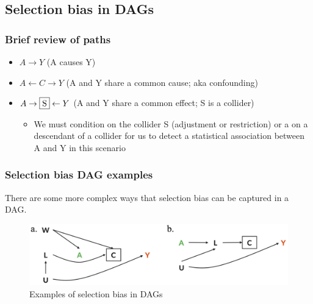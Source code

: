 \documentclass[
]{book}
\providecommand{\tightlist}{%
  \setlength{\itemsep}{0pt}\setlength{\parskip}{0pt}}
\begin{document}
\hypertarget{selection-bias-in-dags}{%
\subsection{Selection bias in DAGs}\label{selection-bias-in-dags}}

\hypertarget{brief-review-of-paths}{%
\subsubsection{Brief review of paths}\label{brief-review-of-paths}}

\begin{itemize}
\tightlist
\item
  \(A \rightarrow Y\) (A causes Y)
\item
  \(A \leftarrow C \rightarrow Y\) (A and Y share a common cause; aka confounding)
\item
  \(A \rightarrow \fbox{S} \leftarrow Y\) (A and Y share a common effect; S is a collider)

  \begin{itemize}
  \tightlist
  \item
    We must condition on the collider S (adjustment or restriction) or a on a descendant of a collider for us to detect a statistical association between A and Y in this scenario
  \end{itemize}
\end{itemize}

\hypertarget{selection-bias-dag-examples}{%
\subsubsection{Selection bias DAG examples}\label{selection-bias-dag-examples}}

There are some more complex ways that selection bias can be captured in a DAG.

\begin{figure}

{\centering \includegraphics[width=1\linewidth]{img/selection-bias/selection_bias_examples} 

}

\caption{Examples of selection bias in DAGs}\label{fig:unnamed-chunk-23}
\end{figure}
\end{document}
